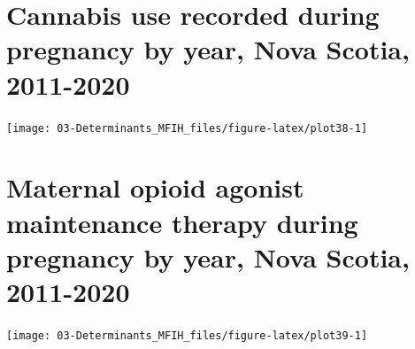 \documentclass[
]{krantz}
\begin{document}
\hypertarget{section-38}{%
\section{Cannabis use recorded during pregnancy by year, Nova Scotia, 2011-2020}\label{section-38}}

\begin{center}\texttt{[image: 03-Determinants\_MFIH\_files/figure-latex/plot38-1]} \end{center}

\begin{table}[H]
\centering
{}
\end{table}

\hypertarget{section-39}{%
\section{Maternal opioid agonist maintenance therapy during pregnancy by year, Nova Scotia, 2011-2020}\label{section-39}}

\begin{center}\texttt{[image: 03-Determinants\_MFIH\_files/figure-latex/plot39-1]} \end{center}
\end{document}

